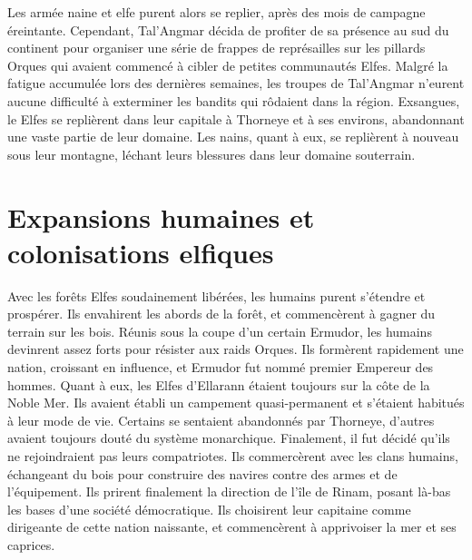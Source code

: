 \newline
Les armée naine et elfe purent alors se replier, après des mois de campagne éreintante. Cependant, Tal'Angmar décida de profiter de sa présence au sud du continent pour organiser une série de frappes de représailles sur les pillards Orques qui avaient commencé à cibler de petites communautés Elfes. Malgré la fatigue accumulée lors des dernières semaines, les troupes de Tal'Angmar n'eurent aucune difficulté à exterminer les bandits qui rôdaient dans la région. Exsangues, le Elfes se replièrent dans leur capitale à Thorneye et à ses environs, abandonnant une vaste partie de leur domaine. Les nains, quant à eux, se replièrent à nouveau sous leur montagne, léchant leurs blessures dans leur domaine souterrain.
\section{Expansions humaines et colonisations elfiques}
Avec les forêts Elfes soudainement libérées, les humains purent s'étendre et prospérer. Ils envahirent les abords de la forêt, et commencèrent à gagner du terrain sur les bois. Réunis sous la coupe d'un certain Ermudor, les humains devinrent assez forts pour résister aux raids Orques. Ils formèrent rapidement une nation, croissant en influence, et Ermudor fut nommé premier Empereur des hommes.
Quant à eux, les Elfes d'Ellarann étaient toujours sur la côte de la Noble Mer. Ils avaient établi un campement quasi-permanent et s'étaient habitués à leur mode de vie. Certains se sentaient abandonnés par Thorneye, d'autres avaient toujours douté du système monarchique. Finalement, il fut décidé qu'ils ne rejoindraient pas leurs compatriotes. Ils commercèrent avec les clans humains, échangeant du bois pour construire des navires contre des armes et de l'équipement. Ils prirent finalement la direction de l'île de Rinam, posant là-bas les bases d'une société démocratique. Ils choisirent leur capitaine comme dirigeante de cette nation naissante, et commencèrent à apprivoiser la mer et ses caprices.